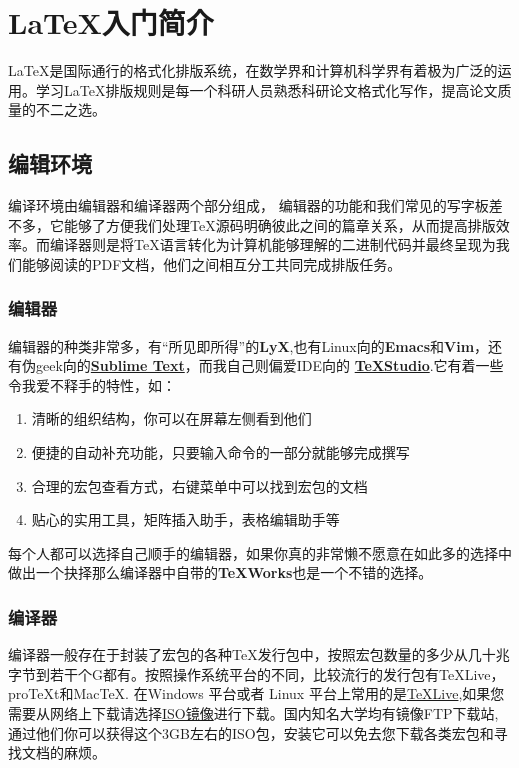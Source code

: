 \section{\LaTeX 入门简介}
\LaTeX 是国际通行的格式化排版系统，在数学界和计算机科学界有着极为广泛的运用。学习\LaTeX 排版规则是每一个科研人员熟悉科研论文格式化写作，提高论文质量的不二之选。
\subsection{编辑环境}
编译环境由编辑器和编译器两个部分组成， 编辑器的功能和我们常见的写字板差不多，它能够了方便我们处理\TeX 源码明确彼此之间的篇章关系，从而提高排版效率。而编译器则是将\TeX 语言转化为计算机能够理解的二进制代码并最终呈现为我们能够阅读的PDF文档，他们之间相互分工共同完成排版任务。
\subsubsection{编辑器}
编辑器的种类非常多，有“所见即所得”的\textbf{LyX},也有Linux向的\textbf{Emacs}和\textbf{Vim}，还有伪geek向的\href{http://www.sublimetext.com/}{\textbf{Sublime Text}}，而我自己则偏爱IDE向的
\href{http://texstudio.sourceforge.net/}{\textbf{\TeX Studio}}.它有着一些令我爱不释手的特性，如：
\begin{enumerate}
\item 清晰的组织结构，你可以在屏幕左侧看到他们
\item 便捷的自动补充功能，只要输入命令的一部分就能够完成撰写
\item 合理的宏包查看方式，右键菜单中可以找到宏包的文档
\item 贴心的实用工具，矩阵插入助手，表格编辑助手等
\end{enumerate}

每个人都可以选择自己顺手的编辑器，如果你真的非常懒不愿意在如此多的选择中做出一个抉择那么编译器中自带的\textbf{\TeX Works}也是一个不错的选择。
\subsubsection{编译器}
编译器一般存在于封装了宏包的各种\TeX 发行包中，按照宏包数量的多少从几十兆字节到若干个G都有。按照操作系统平台的不同，比较流行的发行包有\TeX Live，pro\TeX t和Mac\TeX . 在Windows 平台或者 Linux 平台上常用的是\href{https://www.tug.org/texlive/}{\TeX Live},如果您需要从网络上下载请选择\href{https://www.tug.org/texlive/acquire-iso.html}{ISO镜像}进行下载。国内知名大学均有镜像FTP下载站,通过他们你可以获得这个3GB左右的ISO包，安装它可以免去您下载各类宏包和寻找文档的麻烦。
